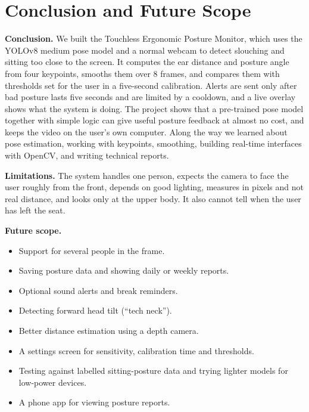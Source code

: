 ﻿\documentclass[12pt,a4paper]{article}
\begin{document}
\clearpage
\section*{Conclusion and Future Scope}

\textbf{Conclusion.} We built the Touchless Ergonomic Posture Monitor, which uses the YOLOv8
medium pose model and a normal webcam to detect slouching and sitting too close to the
screen. It computes the ear distance and posture angle from four keypoints, smooths them
over 8 frames, and compares them with thresholds set for the user in a five-second
calibration. Alerts are sent only after bad posture lasts five seconds and are limited by a
cooldown, and a live overlay shows what the system is doing. The project shows that a
pre-trained pose model together with simple logic can give useful posture feedback at
almost no cost, and keeps the video on the user's own computer. Along the way we learned
about pose estimation, working with keypoints, smoothing, building real-time interfaces
with OpenCV, and writing technical reports.

\textbf{Limitations.} The system handles one person, expects the camera to face the user
roughly from the front, depends on good lighting, measures in pixels and not real
distance, and looks only at the upper body. It also cannot tell when the user has left
the seat.

\textbf{Future scope.}
\begin{itemize}
    \item Support for several people in the frame.
    \item Saving posture data and showing daily or weekly reports.
    \item Optional sound alerts and break reminders.
    \item Detecting forward head tilt (``tech neck'').
    \item Better distance estimation using a depth camera.
    \item A settings screen for sensitivity, calibration time and thresholds.
    \item Testing against labelled sitting-posture data and trying lighter models for
          low-power devices.
    \item A phone app for viewing posture reports.
\end{itemize}

\clearpage
\end{document}
